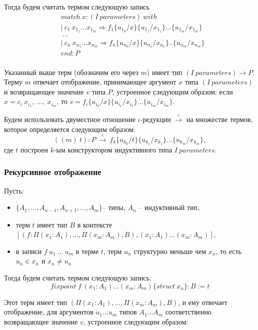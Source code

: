 \documentclass[12pt]{article}
\begin{document}
Тогда будем считать термом следующую запись
\begin{align*}
& match\ x : (I\ parameters)\ with \\
& |\ c_1\ x_{1_1} ... x_{1_m} \Rightarrow f_1\{u_{1_0}/x\}\{u_{1_1}/x_{1_1}\}...\{u_{1_m}/x_{1_m}\}\\
& \ ... \\
& |\ c_n\ x_{n_1} ... x_{n_m} \Rightarrow f_n\{u_{n_0}/x\}\{u_{n_1}/x_{n_1}\}..\{u_{n_m}/x_{n_m}\} \\
& end: P \\
\end{align*}

Указанный выше терм (обозначим его через $m$) имеет тип $(I\ parameters) \xrightarrow{} P$.
Терму $m$ отвечает отображение, принимающее аргумент $x$ типа $(I\ parameters)$ и возвращающее значение $v$ типа $P$, устроенное следующим образом:
если $x = c_i\ x_{i_1},\ ...,\ x_{i_m}$, то $v = f_i\{u_{i_0}/x\}\{u_{i_1}/x_{i_1}\}...\{u_{i_m}/x_{i_m}\}.$

Будем использовать двуместное отношение $\iota$-редукции 
$\xrightarrow{\iota}$ на множестве термов, которое определяется следующим образом:
$$((m)\ t):P\ \xrightarrow{\iota}\ f_k\{u_{k_0}/t\}\{u_{k_1}/x_{k_1}\}...\{u_{k_m}/x_{k_m}\},$$
где $t$ построен $k$-ым конструктором индуктивного типа $I\ parameters$.

\subsubsection{Рекурсивное отображение}

Пусть:
\begin{itemize}
    \item $\{A_1,...,A_{n-1},A_{n+1},...,A_m \}$-- типы, $A_n$ -- индуктивный тип,
    \item терм $t$ имеет тип $B$ в контексте 
    $[(f : \Pi(x_1 : A_1), ...,\Pi(x_m : A_m), B), (x_1 : A_1)...(x_m : A_m)]$,
    \item в записи $f\ u_1\ ...\ u_m$ в терме $t$, терм $u_n$ структурно меньше чем $x_n$, то есть $u_n \in x_n$ и $x_n \neq u_n$
\end{itemize}

Тогда будем считать термом следующую запись:
$$fixpoint\ f\ (x_1:A_1)...(x_m:A_m)\{struct\ x_n\}:B:=t$$

Этот терм имеет тип $(\Pi (x_1:A_1),...,\Pi (x_m:A_m), B)$, и ему отвечает отображение, для аргументов $u_1 ... u_m$ типов $A_1 ... A_m$ соответственно возвращающее значение $v$, устроенное следующим образом:
\end{document}
